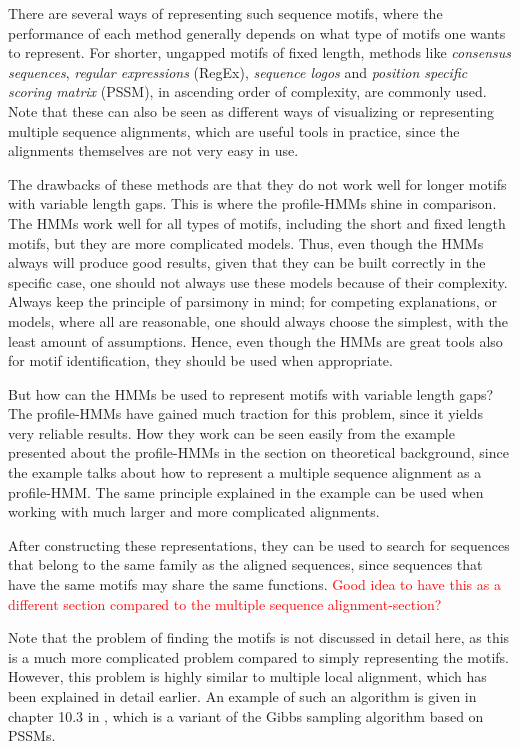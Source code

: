 \documentclass{article}
\begin{document}
There are several ways of representing such sequence motifs, where the performance of each method generally depends on what type of motifs one wants to represent. For shorter, ungapped motifs of fixed length, methods like \textit{consensus sequences}, \textit{regular expressions} (RegEx), \textit{sequence logos} and \textit{position specific scoring matrix} (PSSM), in ascending order of complexity, are commonly used. Note that these can also be seen as different ways of visualizing or representing multiple sequence alignments, which are useful tools in practice, since the alignments themselves are not very easy in use. 

The drawbacks of these methods are that they do not work well for longer motifs with variable length gaps. This is where the profile-HMMs shine in comparison. The HMMs work well for all types of motifs, including the short and fixed length motifs, but they are more complicated models. Thus, even though the HMMs always will produce good results, given that they can be built correctly in the specific case, one should not always use these models because of their complexity. Always keep the principle of parsimony in mind; for competing explanations, or models, where all are reasonable, one should always choose the simplest, with the least amount of assumptions. Hence, even though the HMMs are great tools also for motif identification, they should be used when appropriate. 

But how can the HMMs be used to represent motifs with variable length gaps? The profile-HMMs have gained much traction for this problem, since it yields very reliable results. How they work can be seen easily from the example presented about the profile-HMMs in the section on theoretical background, since the example talks about how to represent a multiple sequence alignment as a profile-HMM. The same principle explained in the example can be used when working with much larger and more complicated alignments. 

After constructing these representations, they can be used to search for sequences that belong to the same family as the aligned sequences, since sequences that have the same motifs may share the same functions. \textcolor{red}{Good idea to have this as a different section compared to the multiple sequence alignment-section?}

Note that the problem of finding the motifs is not discussed in detail here, as this is a much more complicated problem compared to simply representing the motifs. However, this problem is highly similar to multiple local alignment, which has been explained in detail earlier. An example of such an algorithm is given in chapter 10.3 in \cite{Christianini2006}, which is a variant of the Gibbs sampling algorithm based on PSSMs. 
\end{document}
